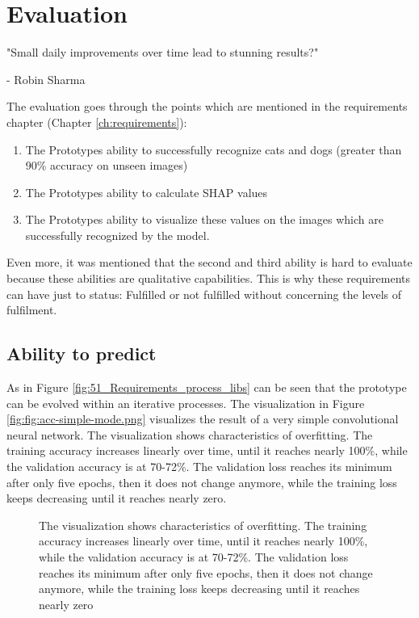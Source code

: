 
\chapter{Evaluation}
\label{ch:summary}
\epigraph{"Small daily improvements over time lead to stunning results?"}{- Robin Sharma}

The evaluation goes through the points which are mentioned in the requirements chapter (Chapter \ref{ch:requirements}):
\begin{enumerate}
\item The Prototypes ability to successfully recognize cats and dogs  (greater than 90\% accuracy on unseen images)
\item The Prototypes ability to calculate SHAP values 
\item The Prototypes ability to visualize these values on the images which are successfully  recognized by the model.
\end{enumerate}

Even more, it was mentioned that the second and third ability is hard to evaluate because these abilities are qualitative capabilities. This is why these requirements can have just to status:  Fulfilled or not fulfilled without concerning the levels of fulfilment.

\section{Ability to predict}

As in Figure \ref{fig:51_Requirements_process_libs} can be seen that the prototype can be evolved within an iterative processes. The visualization in Figure \ref{fig:fig:acc-simple-mode.png} visualizes the result of a very simple convolutional neural network. The visualization shows  characteristics of overfitting. The training accuracy increases linearly over time, until it reaches nearly 100\%, while the validation accuracy is at 70-72\%. The validation loss reaches its minimum after only five epochs, then it does not change anymore, while the training loss keeps decreasing until it reaches nearly zero.

\begin{figure}[htp]
	\centering
	\caption{The visualization shows  characteristics of overfitting. The training accuracy increases linearly over time, until it reaches nearly 100\%, while the validation accuracy is at 70-72\%. The validation loss reaches its minimum after only five epochs, then it does not change anymore, while the training loss keeps decreasing until it reaches nearly zero}
	\label{fig:acc-simple-mode.png}
\end{figure}

